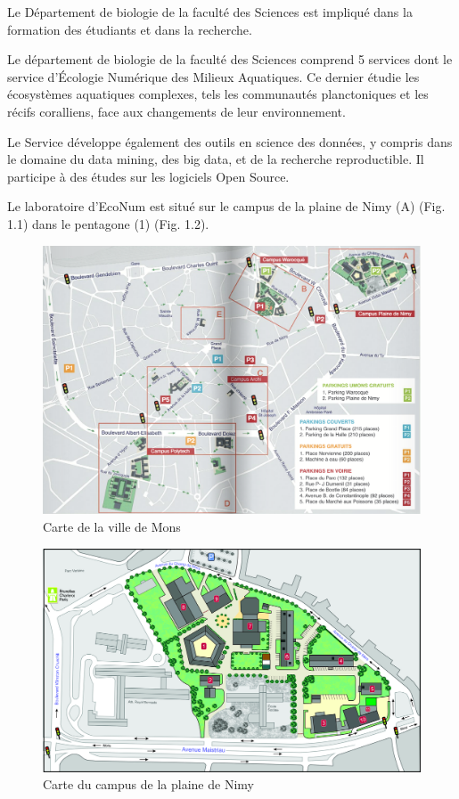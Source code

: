 \documentclass[]{report}
\begin{document}
Le Département de biologie de la faculté des Sciences est impliqué dans
la formation des étudiants et dans la recherche.

Le département de biologie de la faculté des Sciences comprend 5
services dont le service d'Écologie Numérique des Milieux Aquatiques. Ce
dernier étudie les écosystèmes aquatiques complexes, tels les
communautés planctoniques et les récifs coralliens, face aux changements
de leur environnement.

Le Service développe également des outils en science des données, y
compris dans le domaine du data mining, des big data, et de la recherche
reproductible. Il participe à des études sur les logiciels Open Source.

Le laboratoire d'EcoNum est situé sur le campus de la plaine de Nimy (A)
(Fig. 1.1) dans le pentagone (1) (Fig. 1.2).

\begin{figure}
\centering
\includegraphics{../image/plan-campus.png}
\caption{Carte de la ville de Mons}
\end{figure}

\begin{figure}
\centering
\includegraphics{../image/plaine-Nimy.jpg}
\caption{Carte du campus de la plaine de Nimy}
\end{figure}
\end{document}
